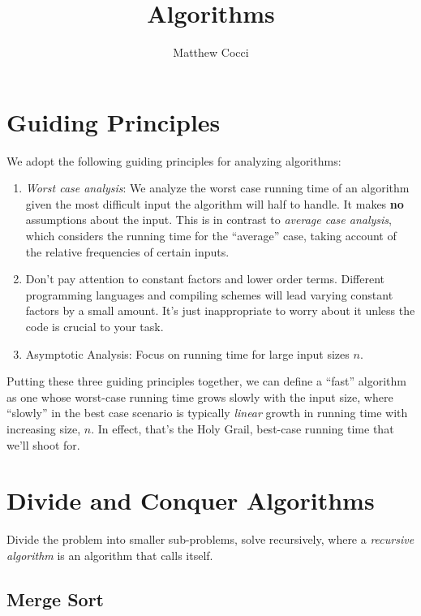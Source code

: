 \documentclass[a4paper,12pt]{scrartcl}
\author{Matthew Cocci}
\title{Algorithms}
\date{}
\begin{document}
\maketitle


\section{Guiding Principles}

We adopt the following guiding principles for analyzing
algorithms:
\begin{enumerate}
    \item \emph{Worst case analysis}: We analyze the worst
	case running time of an algorithm given the most
	difficult input the algorithm will half to handle. 
	It makes \textbf{no} assumptions about the input.
	This is in contrast to \emph{average case analysis},
	which considers the running time for the ``average''
	case, taking account of the relative frequencies of 
	certain inputs.
    \item Don't pay attention to constant factors and
	lower order terms. Different programming languages
	and compiling schemes will lead varying constant
	factors by a small amount. It's just inappropriate
	to worry about it unless the code is crucial to
	your task.
    \item Asymptotic Analysis: Focus on running time for 
	large input sizes $n$.
\end{enumerate}
Putting these three guiding principles together, we can
define a ``fast'' algorithm as one whose worst-case 
running time grows slowly with the input size,
where ``slowly'' in the best case scenario is typically
\emph{linear} growth in running time with increasing size, $n$.
In effect, that's the Holy Grail, best-case running time
that we'll shoot for.


\section{Divide and Conquer Algorithms}

Divide the problem into smaller sub-problems, solve recursively,
where a \emph{recursive algorithm} is an algorithm that calls itself.


\subsection{Merge Sort}
\end{document}
